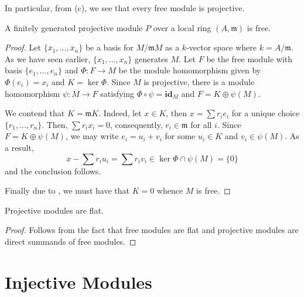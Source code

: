In particular, from (c), we see that every free module is projective.

\begin{lemma}
    A finitely generated projective module $P$ over a local ring $(A,\mathfrak m)$ is free.
\end{lemma}
\begin{proof}
    Let $\{\overline x_1,\ldots,\overline x_n\}$ be a basis for $M/\mathfrak mM$ as a $k$-vector space where $k = A/\mathfrak m$. As we have seen earlier, $\{x_1,\ldots,x_n\}$ generates $M$. Let $F$ be the free module with basis $\{e_1,\ldots,e_n\}$ and $\Phi: F\to M$ be the module homomorphism given by $\Phi(e_i) = x_i$ and $K = \ker\Phi$. Since $M$ is projective, there is a module homomorphism $\psi: M\to F$ satisfying $\Phi\circ\psi = \mathbf{id}_M$ and $F = K\oplus\psi(M)$.

    We contend that $K = \mathfrak mK$. Indeed, let $x\in K$, then $x = \sum r_ie_i$ for a unique choice $\{r_1,\ldots,r_n\}$. Then, $\sum r_ix_i = 0$, consequently, $r_i\in\mathfrak m$ for all $i$. Since $F = K\oplus\psi(M)$, we may write $e_i = u_i + v_i$ for some $u_i\in K$ and $v_i\in\psi(M)$. As a result, 
    \begin{equation*}
        x - \sum r_iu_i = \sum r_iv_i\in\ker\Phi\cap\psi(M) = \{0\}
    \end{equation*}
    and the conclusion follows.

    Finally due to , we must have that $K = 0$ whence $M$ is free.
\end{proof}

\begin{proposition}
    Projective modules are flat.
\end{proposition}
\begin{proof}
    Follows from the fact that free modules are flat and projective modules are direct summands of free modules.
\end{proof}

\section{Injective Modules}

